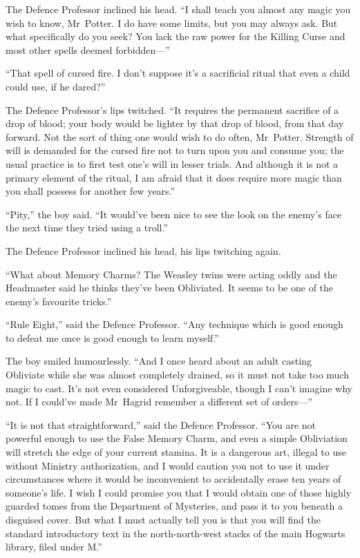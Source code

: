 The Defence Professor inclined his head.
“I shall teach you almost any magic you wish to know, Mr~Potter. I do have some limits, but you may always ask. But what specifically do you seek? You lack the raw power for the Killing Curse and most other spells deemed forbidden—”

“That spell of cursed fire. I don’t suppose it’s a sacrificial ritual that even a child could use, if he dared?”

The Defence Professor’s lips twitched.
“It requires the permanent sacrifice of a drop of blood; your body would be lighter by that drop of blood, from that day forward. Not the sort of thing one would wish to do often, Mr~Potter. Strength of will is demanded for the cursed fire not to turn upon you and consume you; the usual practice is to first test one’s will in lesser trials. And although it is not a primary element of the ritual, I am afraid that it does require more magic than you shall possess for another few years.”

“Pity,” the boy said.
“It would’ve been nice to see the look on the enemy’s face the next time they tried using a troll.”

The Defence Professor inclined his head, his lips twitching again.

“What about Memory Charms? The Weasley twins were acting oddly and the Headmaster said he thinks they’ve been Obliviated. It seems to be one of the enemy’s favourite tricks.”

“Rule Eight,” said the Defence Professor.
“Any technique which is good enough to defeat me once is good enough to learn myself.”

The boy smiled humourlessly.
“And I once heard about an adult casting Obliviate while she was almost completely drained, so it must not take too much magic to cast. It’s not even considered Unforgiveable, though I can’t imagine why not. If I could’ve made Mr~Hagrid remember a different set of orders—”

“It is not that straightforward,” said the Defence Professor.
“You are not powerful enough to use the False Memory Charm, and even a simple Obliviation will stretch the edge of your current stamina. It is a dangerous art, illegal to use without Ministry authorization, and I would caution you not to use it under circumstances where it would be inconvenient to accidentally erase ten years of someone’s life. I wish I could promise you that I would obtain one of those highly guarded tomes from the Department of Mysteries, and pass it to you beneath a disguised cover. But what I must actually tell you is that you will find the standard introductory text in the north-north-west stacks of the main Hogwarts library, filed under M.”

